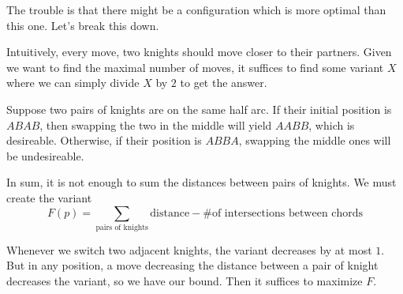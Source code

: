 \documentclass[11pt]{scrartcl}
\theoremstyle{plain} %
\theoremstyle{definition}
\theoremstyle{remark}
\theoremstyle{empty}
\theoremstyle{empty}
\theoremstyle{empty}
\theoremstyle{empty}
\theoremstyle{empty}
\theoremstyle{empty}
\begin{document}
The trouble is that there might be a configuration which is more optimal than this one. Let's break this down.

Intuitively, every move, two knights should move closer to their partners. Given we want to find the maximal number of moves, it suffices to find some variant $X$ where we can simply divide $X$ by $2$ to get the answer. 

Suppose two pairs of knights are on the same half arc. If their initial position is $ABAB$, then swapping the two in the middle will yield $AABB$, which is desireable. Otherwise, if their position is $ABBA$, swapping the middle ones will be undesireable.

\begin{minipage}{0.6\textwidth}
\end{minipage}
\begin{minipage}{0.5\textwidth}
\end{minipage}

In sum, it is not enough to sum the distances between pairs of knights. We must create the variant \[F(p) = \sum _{\text{pairs of knights}}\text{distance} - \text{\# of intersections between chords}\] 

Whenever we switch two adjacent knights, the variant decreases by at most $1$. But in any position, a move decreasing the distance between a pair of knight decreases the variant, so we have our bound. Then it suffices to maximize $F$. 
\end{document}
